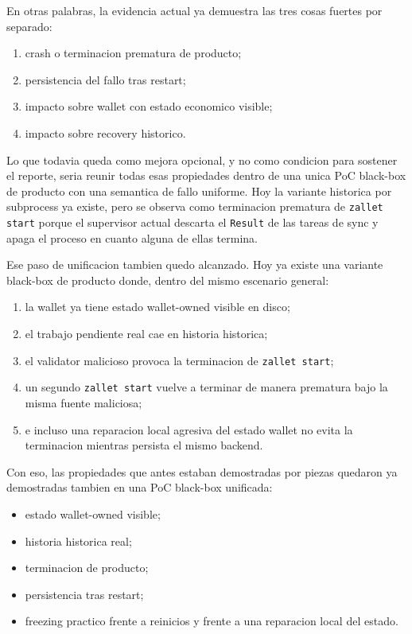 \documentclass[11pt,a4paper]{article}
\begin{document}
En otras palabras, la evidencia actual ya demuestra las tres cosas fuertes por
separado:

\begin{enumerate}[leftmargin=2em]
    \item crash o terminacion prematura de producto;
    \item persistencia del fallo tras restart;
    \item impacto sobre wallet con estado economico visible;
    \item impacto sobre recovery historico.
\end{enumerate}

Lo que todavia queda como mejora opcional, y no como condicion para sostener el
reporte, seria reunir todas esas propiedades dentro de una unica PoC black-box
de producto con una semantica de fallo uniforme. Hoy la variante historica por
subprocess ya existe, pero se observa como terminacion prematura de
\texttt{zallet start} porque el supervisor actual descarta el
\texttt{Result} de las tareas de sync y apaga el proceso en cuanto alguna de
ellas termina.

Ese paso de unificacion tambien quedo alcanzado. Hoy ya existe una variante
black-box de producto donde, dentro del mismo escenario general:

\begin{enumerate}[leftmargin=2em]
    \item la wallet ya tiene estado wallet-owned visible en disco;
    \item el trabajo pendiente real cae en historia historica;
    \item el validator malicioso provoca la terminacion de
    \texttt{zallet start};
    \item un segundo \texttt{zallet start} vuelve a terminar de manera
    prematura bajo la misma fuente maliciosa;
    \item e incluso una reparacion local agresiva del estado wallet no evita la
    terminacion mientras persista el mismo backend.
\end{enumerate}

Con eso, las propiedades que antes estaban demostradas por piezas quedaron ya
demostradas tambien en una PoC black-box unificada:

\begin{itemize}[leftmargin=2em]
    \item estado wallet-owned visible;
    \item historia historica real;
    \item terminacion de producto;
    \item persistencia tras restart;
    \item freezing practico frente a reinicios y frente a una reparacion local
    del estado.
\end{itemize}
\end{document}
